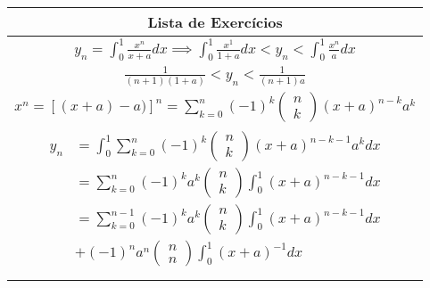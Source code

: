 \documentclass{article}
\begin{document}
\vspace{2em}
\begin{tabularx}{.5\textwidth}{c}
\toprule
Lista de Exercícios\\
\midrule
$ y_n = \int_0^1 \frac{x^n}{x+a} dx \implies \int_0^1 \frac{x^1}{1+a}dx < y_n < \int_0^1 \frac{x^n}{a}dx$\\
$ \frac{1}{(n+1)(1+a)} < y_n < \frac{1}{(n+1)a}$\\
$ x^n = [(x+a)-a)]^n = \displaystyle\sum_{k=0}^{n} (-1)^k \left( \begin{array}{c}
n\\
k
\end{array}
\right) (x+a)^{n-k}a^k$\\

$
\begin{aligned}
 y_n &= \displaystyle \int_0^1 \displaystyle \sum_{k=0}^{n} (-1)^k \left( \begin{array}{c}
n\\
k
\end{array}
\right) (x+a)^{n-k-1}a^k dx\\

&= \displaystyle \sum_{k=0}^{n} (-1)^k a^k \left( \begin{array}{c}
n\\
k
\end{array}
\right) \displaystyle \int_0^1 (x+a)^{n-k-1} dx\\

&= \displaystyle \sum_{k=0}^{n-1} (-1)^k a^k \left( \begin{array}{c}
n\\
k
\end{array}
\right) \displaystyle \int_0^1 (x+a)^{n-k-1} dx\\

&+ (-1)^n a^n \left( \begin{array}{c}
n\\
n
\end{array}
\right) \displaystyle \int_0^1 (x+a)^{-1}dx\\
\end{aligned}
$\\
\midrule
\end{tabularx}
\end{document}

